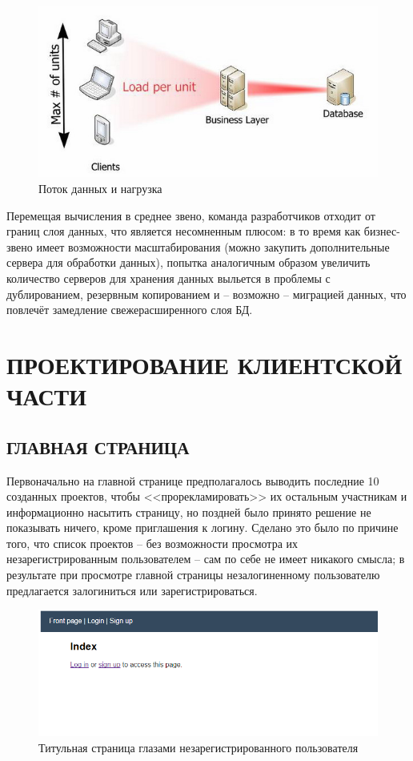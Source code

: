 \documentclass[14pt, a4paper]{extreport}
\begin{document}
\begin{figure}[!htb]
  \centering
    \includegraphics[scale=0.5]{../shared_images/business-logic/scaling.jpg}
   \caption{Поток данных и нагрузка}
    \label{fig:start}
\end{figure}

Перемещая вычисления в среднее звено, команда разработчиков отходит от границ слоя данных, что является несомненным плюсом: в то время как бизнес-звено имеет возможности масштабирования (можно закупить дополнительные сервера для обработки данных), попытка аналогичным образом увеличить количество серверов для хранения данных выльется в проблемы с дублированием, резервным копированием и -- возможно -- миграцией данных, что повлечёт замедление свежерасширенного слоя БД.


\chapter{\MakeTextUppercase{Проектирование клиентской части}}
\section{\MakeTextUppercase{Главная страница}}
Первоначально на главной странице предполагалось выводить последние 10 созданных проектов, чтобы <<прорекламировать>> их остальным участникам и информационно насытить страницу, но поздней было принято решение не показывать ничего, кроме приглашения к логину. Сделано это было по причине того, что список проектов -- без возможности просмотра их незарегистрированным пользователем -- сам по себе не имеет никакого смысла; в результате при просмотре главной страницы незалогиненному пользователю предлагается залогиниться или зарегистрироваться.

\begin{figure}[!htb]
  \centering
    \includegraphics[scale=0.75]{../shared_images/frontend/title-not-logged-in.png}
   \caption{Титульная страница глазами незарегистрированного пользователя}
    \label{fig:start}
\end{figure}
\end{document}
